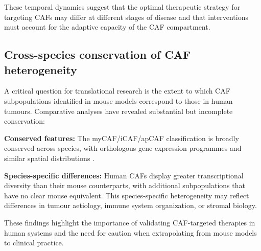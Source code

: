 These temporal dynamics suggest that the optimal therapeutic strategy for targeting CAFs may differ at different stages of disease and that interventions must account for the adaptive capacity of the CAF compartment.

\subsection{Cross-species conservation of CAF heterogeneity}

A critical question for translational research is the extent to which CAF subpopulations identified in mouse models correspond to those in human tumours. Comparative analyses have revealed substantial but incomplete conservation:

\textbf{Conserved features:} The myCAF/iCAF/apCAF classification is broadly conserved across species, with orthologous gene expression programmes and similar spatial distributions \citep{erve2024}.

\textbf{Species-specific differences:} Human CAFs display greater transcriptional diversity than their mouse counterparts, with additional subpopulations that have no clear mouse equivalent. This species-specific heterogeneity may reflect differences in tumour aetiology, immune system organization, or stromal biology.

These findings highlight the importance of validating CAF-targeted therapies in human systems and the need for caution when extrapolating from mouse models to clinical practice.
